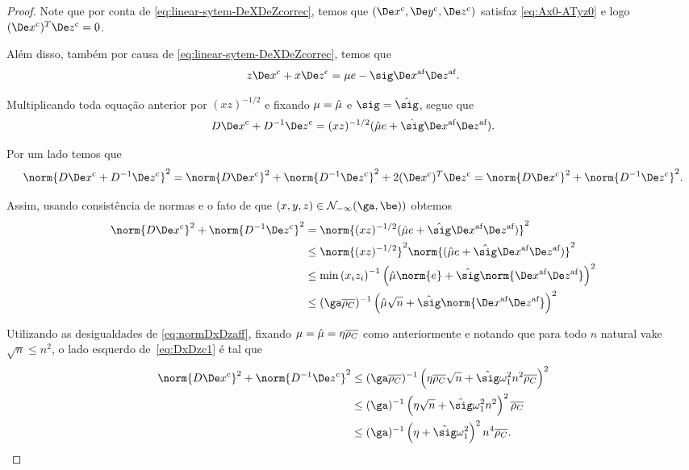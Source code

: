 \begin{proof}
	Note que por conta de \eqref{eq:linear-sytem-DeXDeZcorrec}, temos que $(\Decox,\Decoy,\Decoz)$ satisfaz \eqref{eq:Ax0-ATyz0} e logo $(\Decox)^{T}\Decoz = 0$. 

	


	Além disso, também por causa de \eqref{eq:linear-sytem-DeXDeZcorrec}, temos que
	\[
	z\Decox + x\Decoz = \mu e  - \sig\dex\dez.
	\]

	Multiplicando toda equação anterior por $(xz)^{-1/2}$ e  fixando $\mu = \hat{\mu}$ e $\sig = \nextsig $, segue que 
	\[
		D\Decox + D^{-1}\Decoz = (xz)^{-1/2}(\nextmu e + \nextsig\dex\dez).
	\] 

	Por um lado temos que 
	\[
		\norm{D\Decox + D^{-1}\Decoz}^{2} = \norm{D\Decox}^{2} + \norm{D^{-1}\Decoz}^{2} + 2(\Decox)^{T}\Decoz = \norm{D\Decox}^{2} + \norm{D^{-1}\Decoz}^{2}.
	\]

Assim, usando consistência de normas e o fato de que  $(x,y,z)\in\Nset_{-\infty}(\ga,\be))$ obtemos
\begin{align}
	\norm{D\Decox}^{2} + \norm{D^{-1}\Decoz}^{2} & = \norm{(xz)^{-1/2}(\nextmu e+ \nextsig\dex\dez)}^{2} \notag\\ 
												& \leq \norm{(xz)^{-1/2}}^{2}\norm{(\nextmu e+ \nextsig\dex\dez)}^{2} \notag\\ 
												& \leq \min\left({x_iz_i}\right)^{-1}\left(\nextmu\norm{ e} +{\nextsig}\norm{\dex\dez}\right)^{2}\notag\\
												& \leq (\ga\dbvec{\rho_C})^{-1}\left(\nextmu\sqrt{n} +{\nextsig}\norm{\dex\dez}\right)^{2} \label{eq:DxDzc1}		
\end{align}



Utilizando as desigualdades de \eqref{eq:normDxDzaff}, fixando $\mu = \hat{\mu} =\eta \overline{\rho_C}$ como anteriormente e notando que para todo $n$ natural vake $\sqrt{n} \leq n^{2}$, o lado esquerdo de~\eqref{eq:DxDzc1} é tal que
\begin{align*}
	\norm{D\Decox}^{2} + \norm{D^{-1}\Decoz}^{2}
							& \leq (\ga\dbvec{\rho_C})^{-1}\left(\eta\dbvec{\rho_C}\sqrt{n} +{\nextsig} \omega_1^{2} n^{2}\dbvec{\rho_C}\right)^{2}\\
							& \leq (\ga)^{-1}\left(\eta\sqrt{n} +{\nextsig} \omega_1^{2} n^{2}\right)^{2}\dbvec{\rho_C}\\
							& \leq (\ga)^{-1}\left(\eta +{\nextsig} \omega_1^{2} \right)^{2}n^{4}\dbvec{\rho_C}.
\end{align*}


\end{proof}
